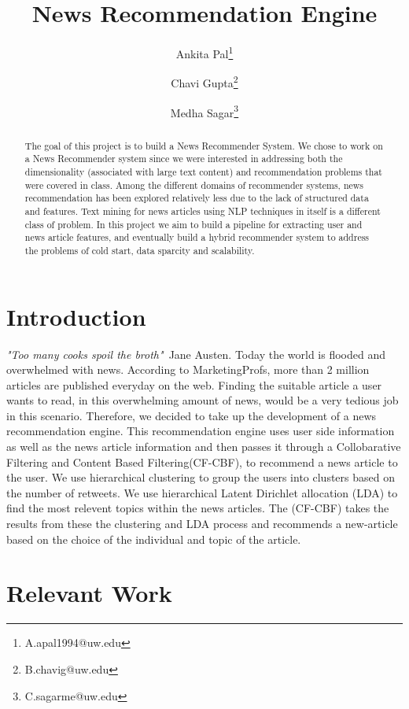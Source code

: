 \documentclass{article}
\title{News Recommendation Engine}
\author[1]{Ankita Pal\thanks{A.apal1994@uw.edu}}
\author[1]{Chavi Gupta\thanks{B.chavig@uw.edu}}
\author[1]{Medha Sagar\thanks{C.sagarme@uw.edu}}
\affil[1]{Department of Data Science, University of Washington}
\begin{document}
\maketitle

\begin{abstract}
    The goal of this project is to build a News Recommender System. We chose to work on a News Recommender system since we were interested in addressing both the dimensionality (associated with large text content) and recommendation problems that were covered in class. Among the different domains of recommender systems, news recommendation has been explored relatively less due to the lack of structured data and features. Text mining for news articles using NLP techniques in itself is a different class of problem. In this project we aim to build a pipeline for extracting user and news article features, and eventually build a hybrid recommender system to address the problems of cold start, data sparcity and scalability. 
\end{abstract}

\section{Introduction}

\textit{"Too many cooks spoil the broth"}~Jane Austen. Today the world is flooded and overwhelmed with news. According to MarketingProfs, more than 2 million articles are published everyday on the web. Finding the suitable article a user wants to read, in this overwhelming amount of news, would be a very tedious job in this scenario. Therefore, we decided to take up the development of a news recommendation engine. This recommendation engine uses user side information as well as the news article information and then passes it through a Collobarative Filtering and Content Based Filtering(CF-CBF), to recommend a news article to the user. We use hierarchical clustering to group the users into clusters based on the number of retweets. We use hierarchical Latent Dirichlet allocation (LDA) to find the most relevent topics within the news articles. The (CF-CBF) takes the results from these the clustering and LDA process and recommends a new-article based on the choice of the individual and topic of the article.

\section{Relevant Work}
\end{document}
